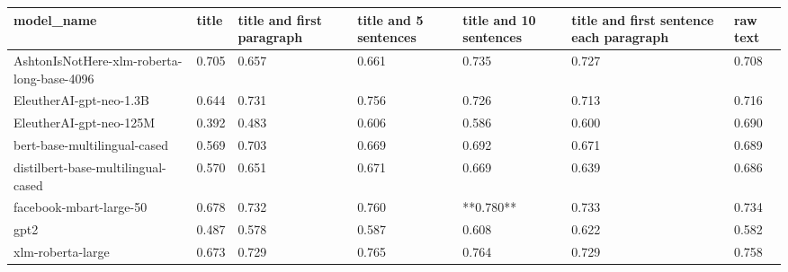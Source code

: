 \begin{tabular}{lllllll}
\toprule
                                model\_name & title & title and first paragraph & title and 5 sentences & title and 10 sentences & title and first sentence each paragraph & raw text \\
\midrule
AshtonIsNotHere-xlm-roberta-long-base-4096 & 0.705 &                     0.657 &                 0.661 &                  0.735 &                                   0.727 &    0.708 \\
                   EleutherAI-gpt-neo-1.3B & 0.644 &                     0.731 &                 0.756 &                  0.726 &                                   0.713 &    0.716 \\
                   EleutherAI-gpt-neo-125M & 0.392 &                     0.483 &                 0.606 &                  0.586 &                                   0.600 &    0.690 \\
              bert-base-multilingual-cased & 0.569 &                     0.703 &                 0.669 &                  0.692 &                                   0.671 &    0.689 \\
        distilbert-base-multilingual-cased & 0.570 &                     0.651 &                 0.671 &                  0.669 &                                   0.639 &    0.686 \\
                   facebook-mbart-large-50 & 0.678 &                     0.732 &                 0.760 &              **0.780** &                                   0.733 &    0.734 \\
                                      gpt2 & 0.487 &                     0.578 &                 0.587 &                  0.608 &                                   0.622 &    0.582 \\
                         xlm-roberta-large & 0.673 &                     0.729 &                 0.765 &                  0.764 &                                   0.729 &    0.758 \\
\bottomrule
\end{tabular}

